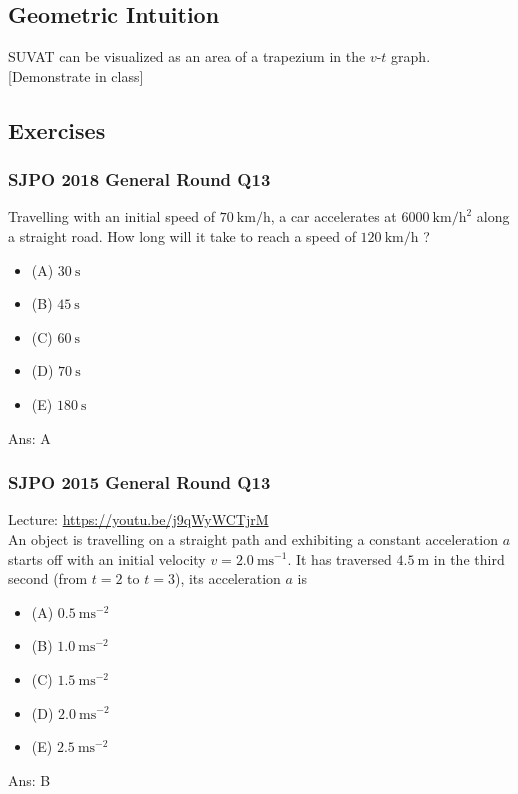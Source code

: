 \documentclass{article}
\begin{document}
\subsection{Geometric Intuition}
SUVAT can be visualized as an area of a trapezium in the $v\text{-}t$ graph. [Demonstrate in class]


\subsection{Exercises}
\begin{samepage}
\subsubsection{SJPO 2018 General Round Q13}
Travelling with an initial speed of $70 \mathrm{~km} / \mathrm{h}$, a car accelerates at $6000 \mathrm{~km} / \mathrm{h}^2$ along a straight road. How long will it take to reach a speed of $120 \mathrm{~km} / \mathrm{h}$ ?
\begin{itemize}
\item[] (A) $30 \mathrm{~s}$
\item[] (B) $45 \mathrm{~s}$
\item[] (C) $60 \mathrm{~s}$
\item[] (D) $70 \mathrm{~s}$
\item[] (E) $180 \mathrm{~s}$
\end{itemize}
Ans: \ifpaper A \fi

\subsubsection{SJPO 2015 General Round Q13}
Lecture: \url{https://youtu.be/j9qWyWCTjrM} \\[10pt]
An object is travelling on a straight path and exhibiting a constant acceleration $a$ starts off with an initial velocity $v=2.0 \mathrm{~ms}^{-1}$. It has traversed $4.5 \mathrm{~m}$ in the third second (from $t=2$ to $t=3$), its acceleration $a$ is
\begin{itemize}\item[](A) $0.5 \mathrm{~ms}^{-2}$
\item[](B) $1.0 \mathrm{~ms}^{-2}$
\item[](C) $1.5 \mathrm{~ms}^{-2}$
\item[](D) $2.0 \mathrm{~ms}^{-2}$
\item[](E) $2.5 \mathrm{~ms}^{-2}$
\end{itemize}
Ans: \ifpaper B \fi
\end{samepage}
\end{document}
